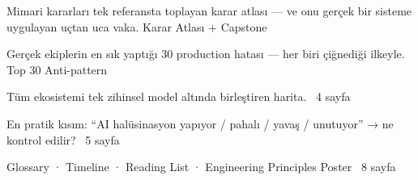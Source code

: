 \documentclass[11pt]{book}
\begin{document}
  {Mimari kararları tek referansta toplayan karar atlası --- ve onu gerçek bir sisteme uygulayan uçtan uca vaka.}
  {Karar Atlası + Capstone}

  {Gerçek ekiplerin en sık yaptığı 30 production hatası --- her biri çiğnediği ilkeyle.}
  {Top 30 Anti-pattern}

  {Tüm ekosistemi tek zihinsel model altında birleştiren harita.}
  {~4 sayfa}

  {En pratik kısım: ``AI halüsinasyon yapıyor / pahalı / yavaş / unutuyor'' → ne kontrol edilir?}
  {~5 sayfa}

\appendix
{}
  {Glossary · Timeline · Reading List · Engineering Principles Poster}
  {~8 sayfa}

\end{document}
